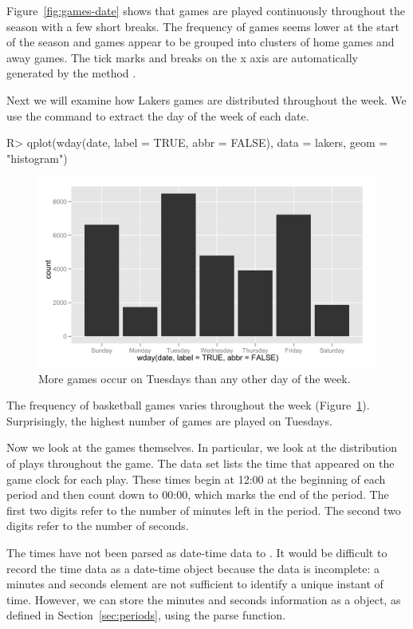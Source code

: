 \documentclass[article]{jss}
\begin{document}
Figure~\ref{fig:games-date} shows that games are played continuously throughout the season with a few short breaks. The frequency of games seems lower at the start of the season and games appear to be grouped into clusters of home games and away games. The tick marks and breaks on the x axis are automatically generated by the  method .

Next we will examine how Lakers games are distributed throughout the week. We use the  command to extract the day of the week of each date.

\begin{CodeInput}
R> qplot(wday(date, label = TRUE, abbr = FALSE), data = lakers, 
    geom = "histogram")
\end{CodeInput}

\begin{figure}[htpb]
  \centering    
    \includegraphics[width=\textwidth]{weekdays-histogram.png}     
  \caption{More games occur on Tuesdays than any other day of the week.}
  \label{fig:games-days}
\end{figure}


The frequency of basketball games varies throughout the week (Figure~\ref{fig:games-days}). Surprisingly, the highest number of games are played on Tuesdays.

Now we look at the games themselves. In particular, we look at the distribution of plays throughout the game. The  data set lists the time that appeared on the game clock for each play. These times begin at 12:00 at the beginning of each period and then count down to 00:00, which marks the end of the period. The first two digits refer to the number of minutes left in the period. The second two digits refer to the number of seconds.

The times have not been parsed as date-time data to . It would be difficult to record the time data as a date-time object because the data is incomplete: a minutes and seconds element are not sufficient to identify a unique instant of time. However, we can store the minutes and seconds information as a \emph{} object, as defined in Section~\ref{sec:periods}, using the  parse function.
\end{document}
